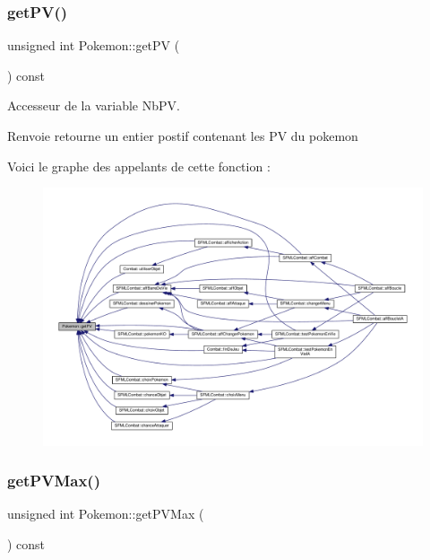 \subsubsection{\texorpdfstring{get\+P\+V()}{getPV()}}
{\footnotesize\ttfamily unsigned int Pokemon\+::get\+PV (\begin{DoxyParamCaption}{ }\end{DoxyParamCaption}) const}



Accesseur de la variable Nb\+PV. 

\begin{DoxyReturn}{Renvoie}
retourne un entier postif contenant les PV du pokemon 
\end{DoxyReturn}
Voici le graphe des appelants de cette fonction \+:\nopagebreak
\begin{figure}[H]
\begin{center}
\leavevmode
\includegraphics[width=350pt]{class_pokemon_a97e2f2b4b811d5e2bbcb038fb70f57ce_icgraph}
\end{center}
\end{figure}
\mbox{\label{class_pokemon_af11b525fb21bb7fbb86c43d1ddad738a}} 
\subsubsection{\texorpdfstring{get\+P\+V\+Max()}{getPVMax()}}
{\footnotesize\ttfamily unsigned int Pokemon\+::get\+P\+V\+Max (\begin{DoxyParamCaption}{ }\end{DoxyParamCaption}) const}



